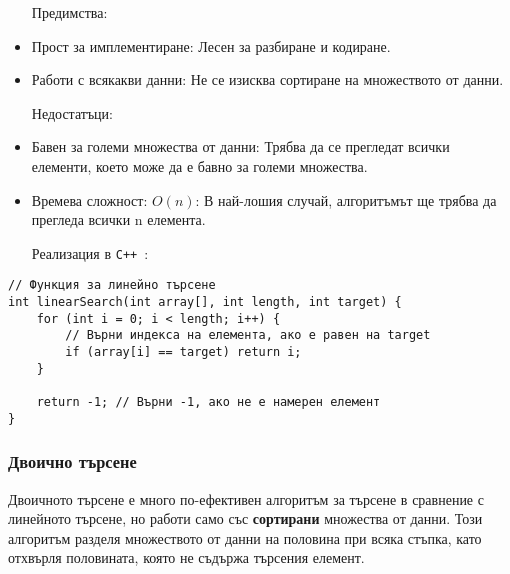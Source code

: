\documentclass[oneside]{book}
\newcommand*{\cpp}{\texttt{C++}\ }
\begin{document}
\begin{itemize}\item[Предимства:]\end{itemize}
\begin{itemize}
    \item Прост за имплементиране: Лесен за разбиране и кодиране.
    \item Работи с всякакви данни: Не се изисква сортиране на множеството от данни.
\end{itemize}

\begin{itemize}\item[Недостатъци:]\end{itemize}
\begin{itemize}
    \item Бавен за големи множества от данни: Трябва да се прегледат всички елементи, което може да е бавно за големи множества.
    \item Времева сложност: $O(n)$: В най-лошия случай, алгоритъмът ще трябва да прегледа всички n елемента.
\end{itemize}

\pagebreak
\begin{itemize}\item[Реализация] в \cpp:\end{itemize}
\begin{mdframed}\begin{lstlisting}
// Функция за линейно търсене
int linearSearch(int array[], int length, int target) {
    for (int i = 0; i < length; i++) {
        // Върни индекса на елемента, ако е равен на target
        if (array[i] == target) return i;
    }
    
    return -1; // Върни -1, ако не е намерен елемент
}
\end{lstlisting}\end{mdframed}

\subsubsection{Двоично търсене}
Двоичното търсене е много по-ефективен алгоритъм за търсене в сравнение с линейното търсене, но работи само със \textbf{сортирани} множества от данни. Този алгоритъм разделя множеството от данни на половина при всяка стъпка, като отхвърля половината, която не съдържа търсения елемент.
\end{document}
